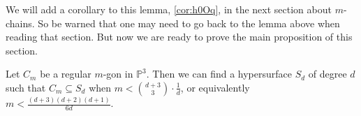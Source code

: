 We will add a corollary to this lemma, \cref{cor:h0Oq}, in the next section about $m$-chains. So be warned that one may need to go back to the lemma above when reading that section. But now we are ready to prove the main proposition of this section.

\begin{proposition}\label{prop:m-gon}
    Let $C_m$ be a regular $m$-gon in $\mathbb{P}^3$. Then we can find a hypersurface $S_d$ of degree $d$ such that $C_m \subseteq S_d$ when $m < \binom{d+3}{3} \cdot \frac{1}{d}$, or equivalently $m < \frac{(d+3)(d+2)(d+1)}{6d}$.
\end{proposition}

